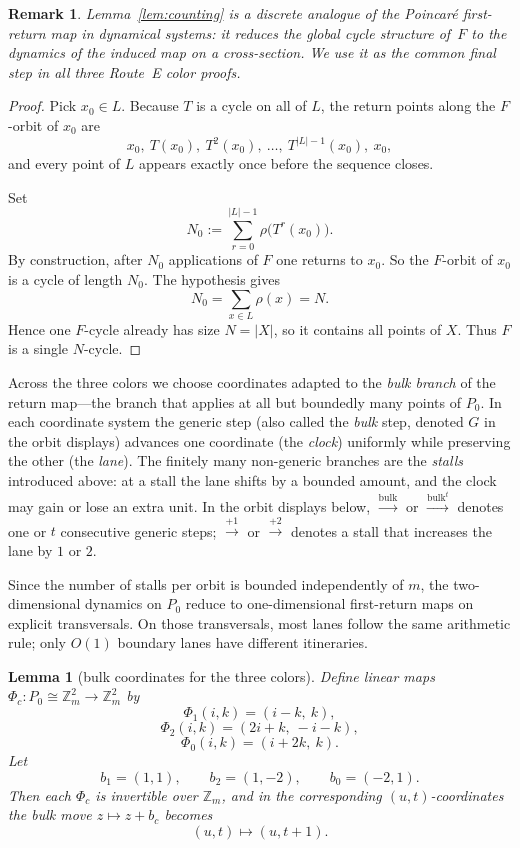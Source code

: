\documentclass[11pt]{article}
\newtheorem{lemma}{Lemma}
\newtheorem{remark}{Remark}
\newcommand{\Zm}{\mathbb Z_m}
\newcommand{\bulk}{\mathrm{bulk}}   %
\begin{document}
\begin{remark}
Lemma~\ref{lem:counting} is a discrete analogue of the Poincar\'e first-return map in dynamical systems: it reduces the global cycle structure of~$F$ to the dynamics of the induced map on a cross-section.  We use it as the common final step in all three Route~E color proofs.
\end{remark}

\begin{proof}
Pick $x_0\in L$.
Because $T$ is a cycle on all of $L$, the return points along the $F$-orbit of $x_0$ are
\[
x_0,\ T(x_0),\ T^2(x_0),\ \dots,\ T^{|L|-1}(x_0),\ x_0,
\]
and every point of $L$ appears exactly once before the sequence closes.

Set
\[
N_0:=\sum_{r=0}^{|L|-1}\rho\bigl(T^r(x_0)\bigr).
\]
By construction, after $N_0$ applications of $F$ one returns to $x_0$.
So the $F$-orbit of $x_0$ is a cycle of length $N_0$.
The hypothesis gives
\[
N_0=\sum_{x\in L}\rho(x)=N.
\]
Hence one $F$-cycle already has size $N=|X|$, so it contains all points of $X$.
Thus $F$ is a single $N$-cycle.
\end{proof}

Across the three colors we choose coordinates adapted to the \emph{bulk branch} of the return map---the branch that applies at all but boundedly many points of $P_0$.
In each coordinate system the generic step (also called the \emph{bulk} step, denoted $G$ in the orbit displays) advances one coordinate (the \emph{clock}) uniformly while preserving the other (the \emph{lane}).
The finitely many non-generic branches are the \emph{stalls} introduced above: at a stall the lane shifts by a bounded amount, and the clock may gain or lose an extra unit.
In the orbit displays below, $\xrightarrow{\bulk}$ or $\xrightarrow{\bulk^t}$ denotes one or $t$ consecutive generic steps; $\xrightarrow{+1}$ or $\xrightarrow{+2}$ denotes a stall that increases the lane by $1$ or $2$.

Since the number of stalls per orbit is bounded independently of $m$, the two-dimensional dynamics on $P_0$ reduce to one-dimensional first-return maps on explicit transversals.
On those transversals, most lanes follow the same arithmetic rule; only $O(1)$ boundary lanes have different itineraries.

\begin{lemma}[bulk coordinates for the three colors]\label{lem:routeE-bulkcoords}
Define linear maps $\Phi_c:P_0\cong \Zm^2\to \Zm^2$ by
\[
\Phi_1(i,k)=(i-k,\ k),
\]
\[
\Phi_2(i,k)=(2i+k,\ -i-k),
\]
\[
\Phi_0(i,k)=(i+2k,\ k).
\]
Let
\[
b_1=(1,1),\qquad b_2=(1,-2),\qquad b_0=(-2,1).
\]
Then each $\Phi_c$ is invertible over $\Zm$, and in the corresponding $(u,t)$-coordinates the bulk move $z\mapsto z+b_c$ becomes
\[
(u,t)\mapsto (u,t+1).
\]
\end{lemma}
\end{document}
